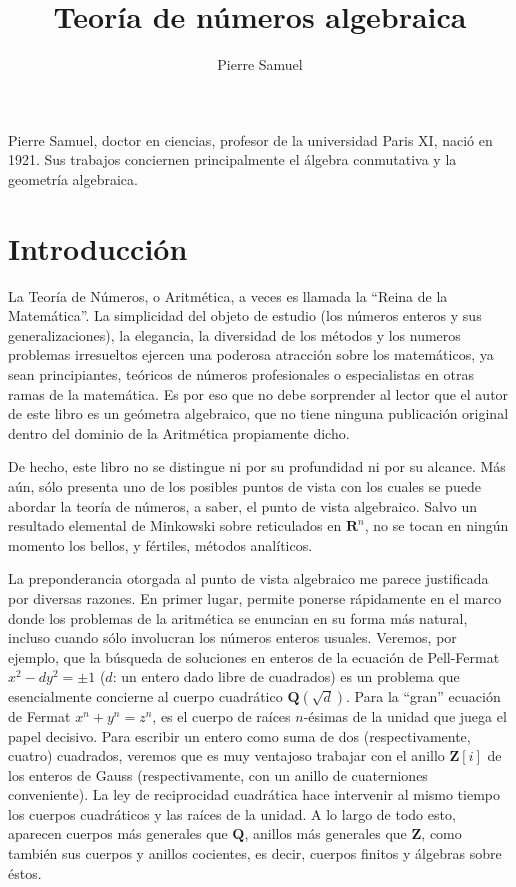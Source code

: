 \documentclass[bibtotoc,leqno,spanish]{amsbook}
\title{Teor\'ia de n\'umeros algebraica}
\author{Pierre Samuel}
\date{}
\newcommand{\RR}{\mathbf{R}}
\newcommand{\QQ}{\mathbf{Q}}
\newcommand{\ZZ}{\mathbf{Z}}
\numberwithin{equation}{section}
\theoremstyle{note}
\theoremstyle{note}
\theoremstyle{rem}
\numberwithin{theorem}{section}
\numberwithin{proposition}{section}
\numberwithin{definition}{section}
\numberwithin{lemma}{section}
\numberwithin{corollary}{section}
\numberwithin{example}{section}
\numberwithin{footnote}{section}%
\begin{document}
\frontmatter

\maketitle

\newpage

Pierre Samuel, doctor en ciencias, profesor de la universidad Paris XI, naci\'o en 1921.
Sus trabajos conciernen principalmente el \'algebra conmutativa y la geometr\'ia algebraica.

\tableofcontents

\chapter*{Introducci\'on}

La Teor\'ia de N\'umeros, o Aritm\'etica, a veces es llamada
la ``Reina de la Matem\'atica''. La simplicidad del objeto
de estudio (los n\'umeros enteros y sus generalizaciones), la elegancia,
la diversidad de los m\'etodos y los numeros problemas irresueltos
ejercen una poderosa atracci\'on sobre los matem\'aticos,
ya sean principiantes, te\'oricos de n\'umeros profesionales o
especialistas en otras ramas de la matem\'atica. Es por eso que no
debe sorprender al lector que el autor de este libro es un ge\'ometra
algebraico, que no tiene ninguna publicaci\'on original dentro
del dominio de la Aritm\'etica propiamente dicho.

De hecho, este libro no se distingue ni por su profundidad ni
por su alcance. M\'as a\'un, s\'olo presenta uno de los posibles
puntos de vista con los cuales se puede abordar la teor\'ia de n\'umeros,
a saber, el punto de vista algebraico. Salvo un resultado elemental
de Minkowski sobre reticulados en $\RR^{n}$, no se tocan en ning\'un
momento los bellos, y f\'ertiles, m\'etodos anal\'iticos.

La preponderancia otorgada al punto de vista algebraico me parece
justificada por diversas razones. En primer lugar, permite ponerse
r\'apidamente en el marco donde los problemas de la aritm\'etica
se enuncian en su forma
m\'as natural, incluso cuando s\'olo involucran los n\'umeros enteros
usuales. Veremos, por ejemplo, que la b\'usqueda de soluciones
en enteros de la ecuaci\'on de {Pell-Fermat} $x^{2}-dy^{2}=\pm 1$
($d$: un entero dado libre de cuadrados) es un problema que esencialmente
concierne al cuerpo cuadr\'atico $\QQ(\sqrt{d})$. Para la
``gran'' ecuaci\'on de {Fermat} $x^{n}+y^{n}=z^{n}$, es el cuerpo de
ra\'ices  $n$-\'esimas de la unidad que juega el papel decisivo.
Para escribir un entero como suma de dos (respectivamente, cuatro)
cuadrados, veremos que es muy ventajoso trabajar con el anillo
$\ZZ[i]$ de los enteros de Gauss (respectivamente, con un
anillo de cuaterniones conveniente). La ley de reciprocidad
cuadr\'atica hace intervenir al mismo tiempo los cuerpos cuadr\'aticos y las ra\'ices de
la unidad. A lo largo de todo esto, aparecen cuerpos m\'as generales que
$\QQ$, anillos m\'as generales que $\ZZ$, como tambi\'en sus cuerpos y
anillos cocientes, es decir, cuerpos finitos y \'algebras
sobre \'estos.
\end{document}
